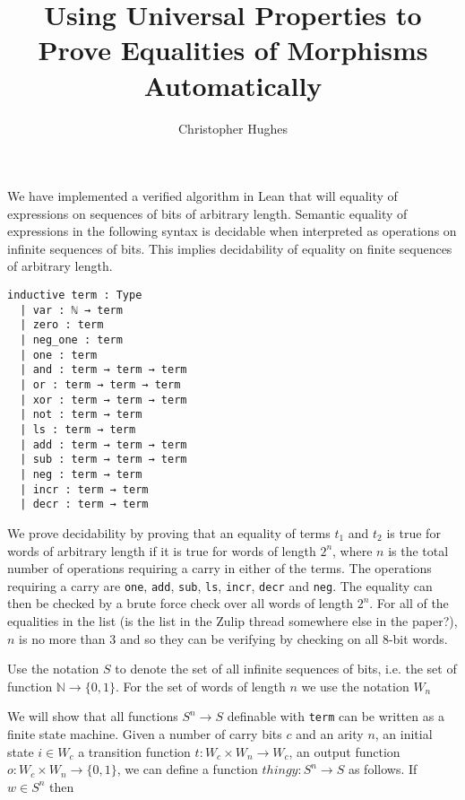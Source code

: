 \documentclass[12pt]{article} %
\title{Using Universal Properties to Prove Equalities of Morphisms Automatically}
\author{Christopher Hughes}
\theoremstyle{definition}
\theoremstyle{definition}
\theoremstyle{definition}
\theoremstyle{definition}
\begin{document}
We have implemented a verified algorithm in Lean that will equality of
expressions on sequences of bits of arbitrary length. Semantic equality
of expressions in the following syntax is decidable when interpreted
as operations on infinite sequences of bits. This implies
decidability of equality on finite sequences of arbitrary length.

\begin{lstlisting}[language=lean]
  inductive term : Type
  | var : ℕ → term
  | zero : term
  | neg_one : term
  | one : term
  | and : term → term → term
  | or : term → term → term
  | xor : term → term → term
  | not : term → term
  | ls : term → term
  | add : term → term → term
  | sub : term → term → term
  | neg : term → term
  | incr : term → term
  | decr : term → term
\end{lstlisting}

We prove decidability by proving that an equality of terms $t_1$ and $t_2$ is true
for words of arbitrary length if it is true for words of length $2^n$,
where $n$ is the total number of operations requiring a carry in either of the terms.
The operations requiring a carry are \lstinline{one}, \lstinline{add}, \lstinline{sub},
\lstinline{ls}, \lstinline{incr}, \lstinline{decr} and \lstinline{neg}.
The equality can then be checked by a brute force check over all words of length $2^n$.
For all of the equalities in the list (is the list in the Zulip thread somewhere else in the paper?),
$n$ is no more than $3$ and so they can be verifying by checking on all $8$-bit words.

Use the notation $S$ to denote the set of all infinite sequences of bits,
i.e. the set of function $\mathbb{N} \rightarrow \{0,1\}$. For the set of
words of length $n$ we use the notation $W_n$



We will show that all functions $S^n \rightarrow S$ definable with \lstinline{term}
can be written as a finite state machine. Given a number of carry bits $c$ and
an arity $n$, an initial state $i \in W_c$ a transition function
$t : W_{c} \times W_n \rightarrow W_{c}$,
an output function $o : W_c \times W_n \rightarrow \{0, 1\}$, we can define
a function $thingy : S^n \rightarrow S$ as follows. If $w \in S^n$ then
\end{document}
